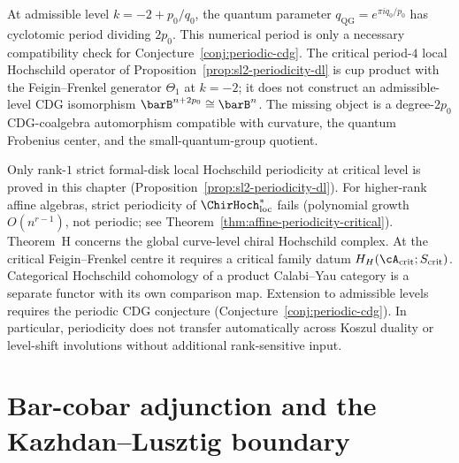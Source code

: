 \begin{remark}
\label{rem:periodicity-quantum}
At admissible level $k = -2 + p_0/q_0$, the quantum parameter
$q_{\mathrm{QG}}=e^{\pi i q_0/p_0}$ has cyclotomic period dividing $2p_0$.
This numerical period is only a necessary compatibility check for
Conjecture~\ref{conj:periodic-cdg}. The critical period-$4$ local
Hochschild operator of Proposition~\ref{prop:sl2-periodicity-dl} is
cup product with the Feigin--Frenkel generator $\Theta_1$ at
$k=-2$; it does not construct an admissible-level CDG isomorphism
$\barB^{n+2p_0}\cong\barB^n$. The missing object is a degree-$2p_0$
CDG-coalgebra automorphism compatible with curvature, the quantum
Frobenius center, and the small-quantum-group quotient.
\end{remark}

\begin{remark}
\label{rem:periodicity-scope-boundary-dl}
Only rank-$1$ strict formal-disk local Hochschild periodicity at
critical level is proved in this chapter
\textup{(}Proposition~\ref{prop:sl2-periodicity-dl}\textup{)}.
For higher-rank affine algebras, strict periodicity of
$\ChirHoch_{\mathrm{loc}}^*$ fails
\textup{(}polynomial growth $O(n^{r-1})$, not periodic; see
Theorem~\ref{thm:affine-periodicity-critical}\textup{)}.
Theorem~H concerns the global curve-level chiral Hochschild complex.
At the critical Feigin--Frenkel centre it requires a critical family
datum $H_H(\cA_{\mathrm{crit}};S_{\mathrm{crit}})$.  Categorical
Hochschild cohomology of a product Calabi--Yau category is a separate
functor with its own comparison map.
Extension to admissible levels requires the periodic CDG conjecture
\textup{(}Conjecture~\ref{conj:periodic-cdg}\textup{)}.
In particular, periodicity does not transfer automatically across Koszul
duality or level-shift involutions without additional rank-sensitive input.
\end{remark}


\section{Bar-cobar adjunction and the Kazhdan--Lusztig boundary}
\label{sec:kl-from-bar-cobar}

